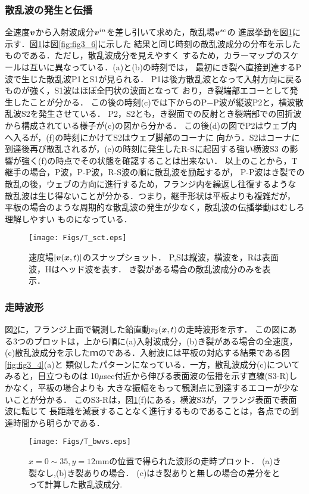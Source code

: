 \subsubsection{散乱波の発生と伝播}
全速度$\mbox{\boldmath $v$}$から入射波成分$\mbox{\boldmath $v$}^{in}$を差し引いて求めた，散乱場$\mbox{\boldmath $v$}^{sc}$の
進展挙動を図\ref{fig:fig3_7}に示す．図\ref{fig:fig3_7}は図\ref{fig:fig3_6}に示した
結果と同じ時刻の散乱波成分の分布を示したものである．ただし，散乱波成分を見えやすく
するため，カラーマップのスケールは互いに異なっている．(a)と(b)の時刻では，
最初にき裂へ直接到達するP波で生じた散乱波P1とS1が見られる．
P1は後方散乱波となって入射方向に戻るものが強く，S1波はほぼ全円状の波面となって
おり，き裂端部エコーとして発生したことが分かる．
この後の時刻(c)では下からのP−P波が縦波P2と，横波散乱波S2を発生させている．
P2，S2とも，き裂面での反射とき裂端部での回折波から構成されている様子が(c)の図から分かる．
この後(d)の図でP2はウェブ内へ入るが，(f)の時刻にかけてS2はウェブ脚部のコーナに
向かう．S2はコーナに到達後再び散乱されるが，(e)の時刻に発生したR-Sに起因する強い横波S3
の影響が強く(f)の時点でその状態を確認することは出来ない．
以上のことから，T継手の場合，P波，P-P波，R-S波の順に散乱波を励起するが，
P-P波はき裂での散乱の後，ウェブの方向に進行するため，フランジ内を繰返し往復するような
散乱波は生じ得ないことが分かる．つまり，継手形状は平板よりも複雑だが，
平板の場合のような周期的な散乱波の発生が少なく，散乱波の伝播挙動はむしろ理解しやすい
ものになっている．
\begin{figure}[h]
	\begin{center}
	\texttt{[image: Figs/T\_sct.eps]} 
	\end{center}
	\caption{
		速度場$|\mbox{\boldmath $v$}(\mbox{\boldmath $x$},t)|$のスナップショット．
		P,Sは縦波，横波を，Rは表面波，Hはヘッド波を表す．
		き裂がある場合の散乱波成分のみを表示．
	} 
	\label{fig:fig3_7}
\end{figure}
\subsubsection{走時波形}
図\ref{fig:fig3_8}に，フランジ上面で観測した鉛直動$v_2(\mbox{\boldmath $x$},t)$の走時波形を示す．
この図にある3つのプロットは，上から順に(a)入射波成分，(b)き裂がある場合の全速度，
(c)散乱波成分を示したｍのである．入射波には平板の対応する結果である図\ref{fig:fig3_4}(a)と
類似したパターンになっている．一方，散乱波成分(c)についてみると，目立つものは
10$\mu$sec付近から伸びる表面波の伝播を示す直線(S3-R)しかなく，平板の場合よりも
大きな振幅をもって観測点に到達するエコーが少ないことが分かる．
このS3-Rは，図\ref{fig:fig3_7}(f)にある，横波S3が，フランジ表面で表面波に転じて
長距離を減衰することなく進行するものであることは，各点での到達時間から明らかである．
\begin{figure}[h]
	\begin{center}
	\texttt{[image: Figs/T\_bwvs.eps]} 
	\end{center}
	\caption{
		$x=0\sim35, y=12$mmの位置で得られた波形の走時プロット．
		(a)き裂なし,(b)き裂ありの場合．
		(c)はき裂ありと無しの場合の差分をとって計算した散乱波成分.
	} 
	\label{fig:fig3_8}
\end{figure}


